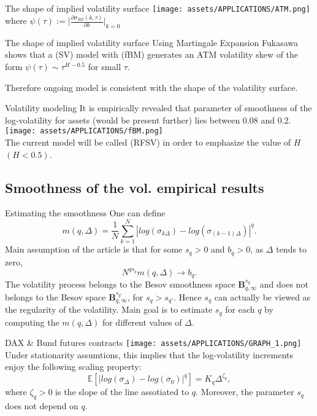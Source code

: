     \begin{frame}{The shape of implied volatility surface}
            \texttt{[image: assets/APPLICATIONS/ATM.png]}\\ \>\>\>\>\>where $\psi(\tau) := |$$\frac{\partial \sigma_{BS}(k, \tau)}{\partial k}$$|_{k = 0}$
    \end{frame}

    \begin{frame}{The shape of implied volatility surface}
        Using Martingale Expansion Fukasawa shows that a (SV) model with (fBM) generates an ATM volatility skew of the form $\psi (\tau) \sim \tau^{H - 0.5}$ for small $\tau$.
        
        Therefore ongoing model is consistent with the shape of the volatility surface. 
    \end{frame}

    \begin{frame}{Volatility modeling}
        It is empirically revealed that parameter of smoothness of the log-volatility for assets (would be present further) lies between $0.08$ and $0.2$.\\
        \texttt{[image: assets/APPLICATIONS/fBM.png]}
        \\The current model will be called (RFSV) in order to emphasize the value of $H$ $(H < 0.5)$.
    \end{frame}

\subsection{Smoothness of the vol. empirical results}
    \begin{frame}{Estimating the smoothness}
        One can define $$m(q, \Delta) = \frac{1}{N}\sum_{k = 1}^{N}|log(\sigma_{k\Delta}) - log(\sigma_{(k - 1)\Delta})|^q.$$
        Main assumption of the article is that for some $s_q > 0$ and $b_q > 0$, as $\Delta$ tends to zero, $$N^{qs_q}m(q, \Delta) \to b_q.$$
        The volatility process belongs to the Besov smoothness space $\mathbf{B}_{q, \infty}^{s_q}$ and does not belongs to the Besov space $\mathbf{B}_{q, \infty}^{s_{q'}}$, for $s_q > s_{q'}.$ Hence $s_q$ can actually be viewed as the regularity of the volatility. Main goal is to estimate $s_q$ for each $q$ by computing the $m(q, \Delta)$ for different values of $\Delta$.
    \end{frame}

    \begin{frame}{DAX \& Bund futures contracts}
        \texttt{[image: assets/APPLICATIONS/GRAPH\_1.png]}\\
        Under stationarity assumtions, this implies that the log-volatility increments enjoy the following scaling property: $$\mathbb{E}[|log(\sigma_{\Delta}) - log(\sigma_0)|^q] = K_q\Delta^{\zeta_q},$$ where $\zeta_q > 0$ is the slope of the line assotiated to $q$. Moreover, the parameter $s_q$ does not depend on $q$.
    \end{frame}

